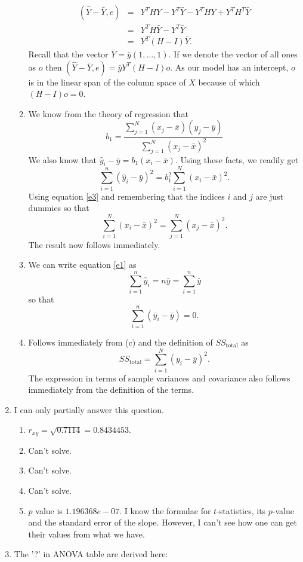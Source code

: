 \documentclass{article}
\begin{document}
\begin{enumerate}
\begin{enumerate}
\begin{eqnarray*}
(\hat{Y} - \bar{Y}, e) &=& Y^THY - Y^T\bar{Y} - Y^THY + Y^TH^T\bar{Y} \\
	&=& Y^TH\bar{Y} - Y^T\bar{Y} \\
	&=& Y^T(H - I)\bar{Y}.
\end{eqnarray*}
Recall that the vector $\bar{Y} = \bar{y}(1, \ldots, 1)$. If we denote the vector of
all ones as $o$ then $(\hat{Y} - \bar{Y}, e) = \bar{y}Y^T(H - I)o$. As our model has
an intercept, $o$ is in the linear span of the column space of $X$ because of which
$(H - I)o = 0$.
\item We know from the theory of regression that
\begin{equation}\label{e3}
b_1 = \frac{\sum_{j=1}^N(x_j - \bar{x})(y_j - \bar{y})}{\sum_{j=1}^N(x_j - \bar{x})^2}
\end{equation}
We also know that $\hat{y}_i - \bar{y} = b_1(x_i - \bar{x})$. Using these facts, we 
readily get
\[
\sum_{i=1}^n(\hat{y}_i - \bar{y})^2 = b_1^2\sum_{i=1}^N(x_i - \bar{x})^2.
\]
Using equation \eqref{e3} and remembering that the indices $i$ and $j$ are just dummies
so that
\[
\sum_{i=1}^N(x_i - \bar{x})^2 = \sum_{j=1}^N(x_j - \bar{x})^2.
\]
The result now follows immediately.
\item We can write equation \eqref{e1} as
\[
    \sum_{i=1}^n \hat{y}_i = n\bar{y} = \sum_{i=1}^n\bar{y}
\]
so that
\[
    \sum_{i=1}^n(\bar{y}_i - \bar{y}) = 0.
\]
\item Follows immediately from (c) and the definition of $SS_{\text{total}}$ as
\[
    SS_{\text{total}} = \sum_{i=1}^N(y_i - \bar{y})^2.
\]
The expression in terms of sample variances and covariance also follows immediately
from the definition of the terms.
\end{enumerate}
\item I can only partially answer this question.
\begin{enumerate}
\item $r_{xy} = \sqrt{0.7114} = 0.8434453$.
\item Can't solve.
\item Can't solve.
\item Can't solve.
\item $p$ value is $1.196368e-07$.
I know the formulae for $t$-statistics, its $p$-value and the standard error of the slope.
However, I can't see how one can get their values from what we have.
\end{enumerate}
\item The '?' in ANOVA table are derived here:

\end{enumerate}
\end{document}
